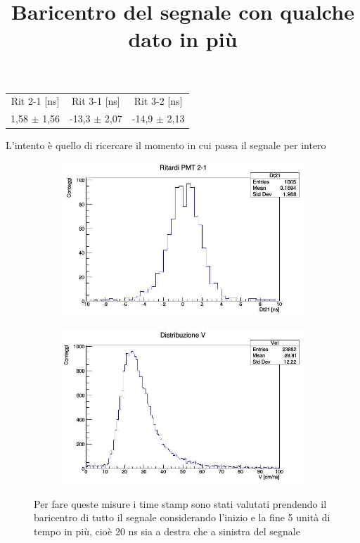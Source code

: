 \documentclass[a4paper]{article}
\begin{document}
\begin{tabular}{c|c|c}
Rit 2-1 [ns] & Rit 3-1 [ns] & Rit 3-2 [ns] \\
\hfill
1,58 $\pm$ 1,56 & -13,3 $\pm$ 2,07 & -14,9 $\pm$ 2,13
\hfill
\label{tab:RitIntSigTot}
\end{tabular}

L'intento è quello di ricercare il momento in cui passa il segnale per intero

\begin{figure}[H]
     \centering
     \title{Baricentro del segnale con qualche dato in più}
     \begin{center}
     \begin{subfigure}[b]{0.4\textwidth}
         \centering
         \includegraphics[width=\textwidth]{./immagini/TimeOfFlight/Rit21Largo.jpg}
         \caption{}
         \label{fig:Dt21Largo}
     \end{subfigure}
     \hfill
     \begin{subfigure}[b]{0.4\textwidth}
         \centering
         \includegraphics[width=\textwidth]{./immagini/TimeOfFlight/VLargo.jpg}
         \caption{}
         \label{fig:VLargo}
     \end{subfigure}
     \end{center}
     \caption{Per fare queste misure i time stamp sono stati valutati prendendo il baricentro di tutto il segnale considerando l'inizio e la fine 5 unità di tempo in più, cioè 20 ns sia a destra che a sinistra del segnale}        
     \label{fig:Largo}
\end{figure}
\end{document}
